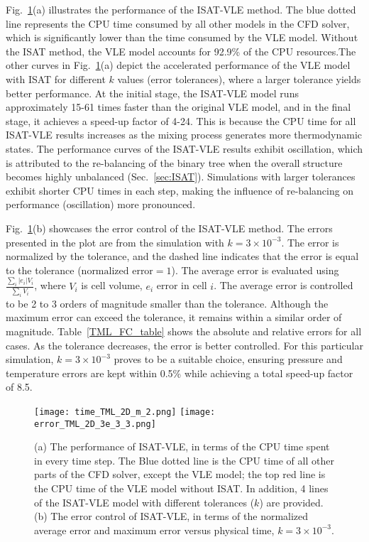 Fig.~\ref{TML_PE}(a) illustrates the performance of the ISAT-VLE method. The blue dotted line represents the CPU time consumed by all other models in the CFD solver, which is significantly lower than the time consumed by the VLE model. Without the ISAT method, the VLE model accounts for 92.9\% of the CPU resources.The other curves in Fig.~\ref{TML_PE}(a) depict the accelerated performance of the VLE model with ISAT for different $k$ values (error tolerances), where a larger tolerance yields better performance. At the initial stage, the ISAT-VLE model runs approximately 15-61 times faster than the original VLE model, and in the final stage, it achieves a speed-up factor of 4-24. This is because the CPU time for all ISAT-VLE results increases as the mixing process generates more thermodynamic states. The performance curves of the ISAT-VLE results exhibit oscillation, which is attributed to the re-balancing of the binary tree when the overall structure becomes highly unbalanced (Sec.~\ref{sec:ISAT}). Simulations with larger tolerances exhibit shorter CPU times in each step, making the influence of re-balancing on performance (oscillation) more pronounced.


Fig.~\ref{TML_PE}(b) showcases the error control of the ISAT-VLE method. The errors presented in the plot are from the simulation with $k= 3 \times 10^{-3}$. The error is normalized by the tolerance, and the dashed line indicates that the error is equal to the tolerance ($\text{normalized error}=1$). The average error is evaluated using $\frac{\sum_i |e_i|V_i}{\sum_i V_i}$, where $V_i$ is cell volume, $e_i$ error in cell $i$. The average error is controlled to be 2 to 3 orders of magnitude smaller than the tolerance. Although the maximum error can exceed the tolerance, it remains within a similar order of magnitude. Table~\ref{TML_FC_table} shows the absolute and relative errors for all cases. As the tolerance decreases, the error is better controlled. For this particular simulation, $k= 3 \times 10^{-3}$ proves to be a suitable choice, ensuring pressure and temperature errors are kept within 0.5\% while achieving a total speed-up factor of 8.5.



\begin{figure}[htbp]
\centering
\texttt{[image: time\_TML\_2D\_m\_2.png]}
\texttt{[image: error\_TML\_2D\_3e\_3\_3.png]}
\caption{(a) The performance of ISAT-VLE, in terms of the CPU time spent in every time step. The Blue dotted line is the CPU time of all other parts of the CFD solver, except the VLE model; the top red line is the CPU time of the VLE model without ISAT. In addition, 4 lines of the ISAT-VLE model with different tolerances ($k$) are provided. (b) The error control of ISAT-VLE, in terms of the normalized average error and maximum error versus physical time, $k=3\times 10^{-3}$.}
\label{TML_PE} 
\end{figure}




